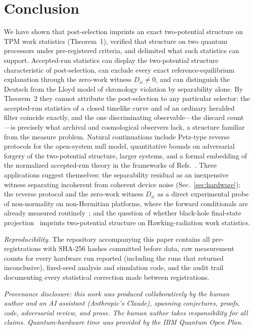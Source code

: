 \documentclass[aps,pra,twocolumn,superscriptaddress,nofootinbib]{revtex4-2}
\begin{document}
\section{Conclusion}
We have shown that post-selection imprints an exact two-potential structure on TPM work statistics (Theorem~1), verified that structure on two quantum processors under pre-registered criteria, and delimited what such statistics can support. Accepted-run statistics can display the two-potential structure characteristic of post-selection, can exclude every exact reference-equilibrium explanation through the zero-work witness $D_{ii}\neq0$, and can distinguish the Deutsch from the Lloyd model of chronology violation by separability alone. By Theorem~2 they cannot attribute the post-selection to any particular selector: the accepted-run statistics of a closed timelike curve and of an ordinary heralded filter coincide exactly, and the one discriminating observable---the discard count---is precisely what archival and cosmological observers lack, a structure familiar from the measure problem. Natural continuations include Petz-type reverse protocols for the open-system null model, quantitative bounds on adversarial forgery of the two-potential structure, larger systems, and a formal embedding of the normalized accepted-run theory in the frameworks of Refs.~\cite{aberg2018,prechpotts2024,cavina2026}. Three applications suggest themselves: the separability residual as an inexpensive witness separating incoherent from coherent device noise (Sec.~\ref{sec:hardware}); the reverse protocol and the zero-work witness $D_{ii}$ as a direct experimental probe of non-normality on non-Hermitian platforms, where the forward conditionals are already measured routinely~\cite{erdamar2024,nhje2026}; and the question of whether black-hole final-state projection~\cite{horowitzmaldacena2004,lloydpreskill2014} imprints two-potential structure on Hawking-radiation work statistics.

\emph{Reproducibility.} The repository accompanying this paper contains all pre-registrations with SHA-256 hashes committed before data, raw measurement counts for every hardware run reported (including the runs that returned inconclusive), fixed-seed analysis and simulation code, and the audit trail documenting every statistical correction made between registrations.

\begin{acknowledgments}
\emph{Provenance disclosure: this work was produced collaboratively by the human author and an AI assistant (Anthropic's Claude), spanning conjectures, proofs, code, adversarial review, and prose. The human author takes responsibility for all claims. Quantum-hardware time was provided by the IBM Quantum Open Plan.}
\end{acknowledgments}
\end{document}
